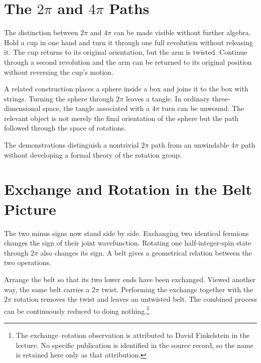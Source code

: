 \section{The \(2\pi\) and \(4\pi\) Paths}

The distinction between \(2\pi\) and \(4\pi\) can be made visible without further algebra. Hold a cup in one hand and turn it through one full revolution without releasing it. The cup returns to its original orientation, but the arm is twisted. Continue through a second revolution and the arm can be returned to its original position without reversing the cup's motion.

A related construction places a sphere inside a box and joins it to the box with strings. Turning the sphere through \(2\pi\) leaves a tangle. In ordinary three-dimensional space, the tangle associated with a \(4\pi\) turn can be unwound. The relevant object is not merely the final orientation of the sphere but the path followed through the space of rotations.

\begin{classroomqa}
\end{classroomqa}

The demonstrations distinguish a nontrivial \(2\pi\) path from an unwindable \(4\pi\) path without developing a formal theory of the rotation group.

\section{Exchange and Rotation in the Belt Picture}

The two minus signs now stand side by side. Exchanging two identical fermions changes the sign of their joint wavefunction. Rotating one half-integer-spin state through \(2\pi\) also changes its sign. A belt gives a geometrical relation between the two operations.

Arrange the belt so that its two lower ends have been exchanged. Viewed another way, the same belt carries a \(2\pi\) twist. Performing the exchange together with the \(2\pi\) rotation removes the twist and leaves an untwisted belt. The combined process can be continuously reduced to doing nothing.\footnote{The exchange--rotation observation is attributed to David Finkelstein in the lecture. No specific publication is identified in the source record, so the name is retained here only as that attribution.}


